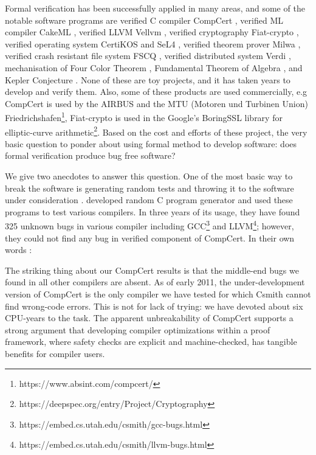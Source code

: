 	Formal verification has been successfully applied in many areas, and 
	some of the notable software programs are 
	verified C compiler CompCert \citep{DBLP:conf/popl/Leroy06}, verified ML compiler
	CakeML \citep{Kumar:2014:CVI}, verified LLVM 
	Vellvm \citep{10.1007/978-3-642-35308-6_6}, verified cryptography 
	Fiat-crypto \citep{DBLP:conf/sp/ErbsenPGSC19}, verified 
	operating system CertiKOS \citep{DBLP:conf/apsys/GuVFSC11} and 
	SeL4 \citep{DBLP:conf/sosp/KleinEHACDEEKNSTW09}, verified theorem 
	prover Milwa \citep{DBLP:conf/itp/MyreenD14}, 
	verified crash resistant file system FSCQ \citep{Chen:2015:UCH:2815400.2815402}, 
	verified distributed system 
	Verdi \citep{DBLP:conf/pldi/WilcoxWPTWEA15}, mechanisation of 
	Four Color Theorem \citep{10.1007/978-3-540-87827-8_28}, 
	Fundamental Theorem of 
	Algebra \citep{10.1007/3-540-45842-5_7}, and Kepler Conjecture \citep{hales-kepler}.
	None of these are toy projects, and it has taken years 
	to develop and verify them. Also, some of these products 
	are used commercially,  e.g CompCert is used by the AIRBUS and the MTU (Motoren und Turbinen Union) 
	Friedrichshafen\footnote{https://www.absint.com/compcert/},  Fiat-crypto is used 
	in the Google's BoringSSL library for elliptic-curve 
	arithmetic\footnote{https://deepspec.org/entry/Project/Cryptography}. 
	Based on the cost and efforts of these project, 
	the very basic question to ponder about using formal method to develop 
	software:  does formal verification produce bug free software?
	
	
	We give two anecdotes to answer this question. 
	One of the most basic way to 
	break the software is generating random tests and throwing it to 
	the software under consideration \citep{Miller:1990:ESR:96267.96279}.
	\citep{Yang:2011:FUB:1993316.1993532} developed random 
	C program generator and used these programs to test various 
	compilers. In three years of its usage, they have found 325 unknown
	bugs in various compiler including 
	GCC\footnote{https://embed.cs.utah.edu/csmith/gcc-bugs.html} and 
	LLVM\footnote{https://embed.cs.utah.edu/csmith/llvm-bugs.html}; however, 
	they could not find any bug in verified component of CompCert. 
	In their own words \citep{Yang:2011:FUB:1993316.1993532}:
	
	\begin{displayquote}
	
	The striking thing about our CompCert results is that the middle-end 
	bugs we found in all other compilers are absent. As of early 2011,
	the under-development version of CompCert is the only compiler we
	have tested for which Csmith cannot find wrong-code errors. This is
	not for lack of trying: we have devoted about six CPU-years to the
	task. The apparent unbreakability of CompCert supports a strong
	argument that developing compiler optimizations within a proof
	framework, where safety checks are explicit and machine-checked,
	has tangible benefits for compiler users.
	
	\end{displayquote}
	

